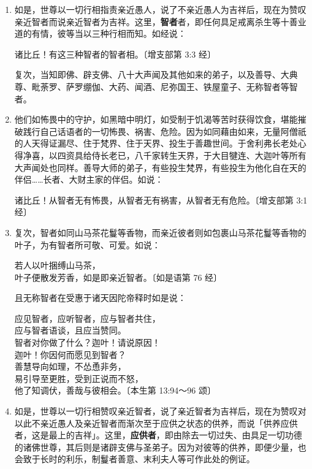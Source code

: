 \begin{enumerate}
\item 如是，世尊以一切行相指责亲近愚人，说了不亲近愚人为吉祥后，现在为赞叹亲近智者而说亲近智者为吉祥。这里，\textbf{智者}者，即任何具足戒离杀生等十善业道的有情，彼等当以三种行相而知。如经说：\begin{quoting}诸比丘！有这三种智者的智者相。{\bluefootnotesize 〔增支部第 3:3 经〕}\end{quoting}复次，当知即佛、辟支佛、八十大声闻及其他如来的弟子，以及善导、大典尊、毗荼罗、萨罗绷伽、大药、闻酒、尼弥国王、铁屋童子、无称智者等智者。
\item 他们如怖畏中的守护，如黑暗中明灯，如受制于饥渴等苦时获得饮食，堪能摧破践行自己话语者的一切怖畏、祸害、危险。因为如同藉由如来，无量阿僧祇的人天得证漏尽、住于梵界、住于天界、投生于善趣世间。于舍利弗长老处心得净喜，以四资具给侍长老已，八千家转生天界，于大目犍连、大迦叶等所有大声闻处也同样。善导大师的弟子，有些投生梵界，有些投生为他化自在天的伴侣……长者、大财主家的伴侣。如说：\begin{quoting}诸比丘！从智者无有怖畏，从智者无有祸害，从智者无有危险。{\bluefootnotesize 〔增支部第 3:1 经〕}\end{quoting}
\item 复次，智者如同山马茶花鬘等香物，而亲近彼者则如包裹山马茶花鬘等香物的叶子，为有智者所可敬、可爱。如说：\begin{quoting}若人以叶捆缚山马茶，\\叶子便散发芳香，如是即亲近智者。{\bluefootnotesize 〔如是语第 76 经〕}\end{quoting}且无称智者在受惠于诸天因陀帝释时如是说：\begin{quoting}应见智者，应听智者，应与智者共住，\\应与智者语谈，且应当赞同。\\智者对你做了什么？迦叶！请说原因！\\迦叶！你因何而愿见到智者？\\善慧导向如理，不怂恿非务，\\易引导至更胜，受到正说而不怒，\\他了知调伏，善哉与彼相会。{\bluefootnotesize 〔本生第 13:94～96 颂〕}\end{quoting}
\item 如是，世尊以一切行相赞叹亲近智者，说了亲近智者为吉祥后，现在为赞叹对以此不亲近愚人及亲近智者而渐次至于应供之状态的供养，而说「供养应供者，这是最上的吉祥」。这里，\textbf{应供者}，即由除去一切过失、由具足一切功德的诸佛世尊，其后则是诸辟支佛与圣弟子。因为对彼等的供养，即便少量，也会致于长时的利乐，制鬘者善意、末利夫人等可作此处的例证。

\end{enumerate}
